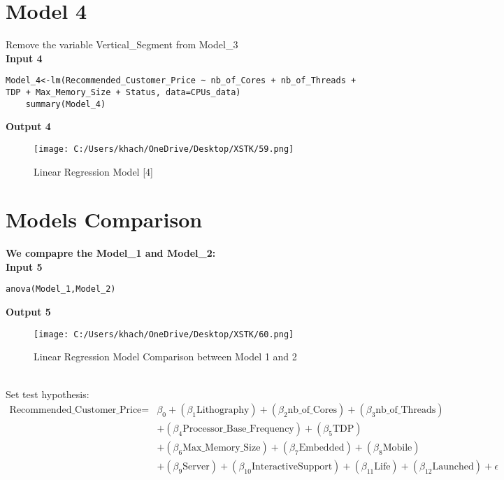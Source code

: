 \documentclass[a4paper]{article}
\begin{document}
	\section*{Model 4}
	Remove the variable Vertical\_Segment  from Model\_3\\
	\textbf{Input 4}
	\begin{lstlisting}[frame=single, backgroundcolor=\color{gray!10}, breaklines=true, columns=fullflexible]
	Model_4<-lm(Recommended_Customer_Price ~ nb_of_Cores + nb_of_Threads + TDP + Max_Memory_Size + Status, data=CPUs_data)
	summary(Model_4)
	\end{lstlisting}
	\textbf{Output 4}
	\begin{figure}[htbp]
		\centering
		\begin{adjustbox}{width=0.7\textwidth, frame}
			\texttt{[image: C:/Users/khach/OneDrive/Desktop/XSTK/59.png]}
		\end{adjustbox}
		\captionsetup{justification=centering}
		\vspace{0.5cm}
		\caption{Linear Regression Model [4]}
	\end{figure}
	\newpage
	\section*{Models Comparison}
	\textbf{We compapre the Model\_1 and Model\_2:}\\
	\textbf{Input 5}
	\begin{lstlisting}[frame=single, backgroundcolor=\color{gray!10}, breaklines=true, columns=fullflexible]
	anova(Model_1,Model_2)
	\end{lstlisting}
	\textbf{Output 5}
	\begin{figure}[htbp]
		\centering
		\begin{adjustbox}{width=0.7\textwidth, frame}
			\texttt{[image: C:/Users/khach/OneDrive/Desktop/XSTK/60.png]}
		\end{adjustbox}
		\captionsetup{justification=centering}
		\vspace{0.5cm}
		\caption{Linear Regression Model Comparison between Model 1 and 2}
	\end{figure}
	\\Set test hypothesis:
	\begin{align*}
	\text{Recommended\_Customer\_Price} = & \beta_0 + (\beta_1 \text{Lithography}) + (\beta_2 \text{nb\_of\_Cores}) + (\beta_3 \text{nb\_of\_Threads}) \\
	& + (\beta_4 \text{Processor\_Base\_Frequency}) + (\beta_5 \text{TDP}) \\
	& + (\beta_6 \text{Max\_Memory\_Size}) + (\beta_7 \text{Embedded}) + (\beta_8 \text{Mobile}) \\
	& + (\beta_9 \text{Server}) + (\beta_{10} \text{InteractiveSupport}) + (\beta_{11} \text{Life}) + (\beta_{12} \text{Launched}) + \epsilon
	\end{align*}
\end{document}
